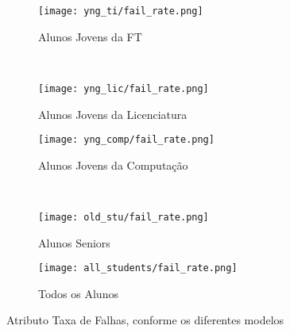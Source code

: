 \clearpage
\begin{figure}[!ht]
    \centering
    \begin{subfigure}[b]{0.48\textwidth}
        \centering
        \texttt{[image: yng\_ti/fail\_rate.png]}
        \caption{Alunos Jovens da FT}
    \end{subfigure}
    ~
    \begin{subfigure}[b]{0.48\textwidth}
        \centering
        \texttt{[image: yng\_lic/fail\_rate.png]}
        \caption{Alunos Jovens da Licenciatura}
    \end{subfigure}

    \begin{subfigure}[b]{0.48\textwidth}
        \centering
        \texttt{[image: yng\_comp/fail\_rate.png]}
        \caption{Alunos Jovens da Computação}
    \end{subfigure}
    ~
    \begin{subfigure}[b]{0.48\textwidth}
        \centering
        \texttt{[image: old\_stu/fail\_rate.png]}
        \caption{Alunos Seniors}
    \end{subfigure}

    \begin{subfigure}[b]{0.48\textwidth}
        \centering
        \texttt{[image: all\_students/fail\_rate.png]}
        \caption{Todos os Alunos}
    \end{subfigure}
    \caption{Atributo Taxa de Falhas, conforme os diferentes modelos}
\end{figure}

